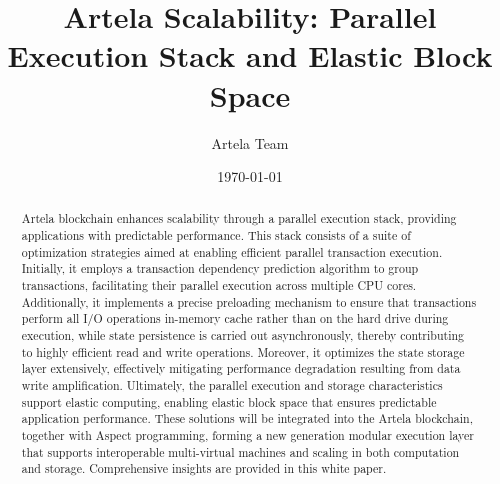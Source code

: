 \documentclass[twocolumn]{article}
\begin{document}
\small

\title{Artela Scalability: Parallel Execution Stack and Elastic Block Space}
\author{Artela Team}
\date{\today}


\maketitle

\begin{abstract}
    Artela blockchain enhances scalability through a parallel execution stack, providing applications with predictable performance. This stack consists of a suite of optimization strategies aimed at enabling efficient parallel transaction execution. Initially, it employs a transaction dependency prediction algorithm to group transactions, facilitating their parallel execution across multiple CPU cores. Additionally, it implements a precise preloading mechanism to ensure that transactions perform all I/O operations in-memory cache rather than on the hard drive during execution, while state persistence is carried out asynchronously, thereby contributing to highly efficient read and write operations. Moreover, it optimizes the state storage layer extensively, effectively mitigating performance degradation resulting from data write amplification. Ultimately, the parallel execution and storage characteristics support elastic computing, enabling elastic block space that ensures predictable application performance. These solutions will be integrated into the Artela blockchain, together with Aspect programming, forming a new generation modular execution layer that supports interoperable multi-virtual machines and scaling in both computation and storage. Comprehensive insights are provided in this white paper.
\end{abstract}











 
\end{document}
